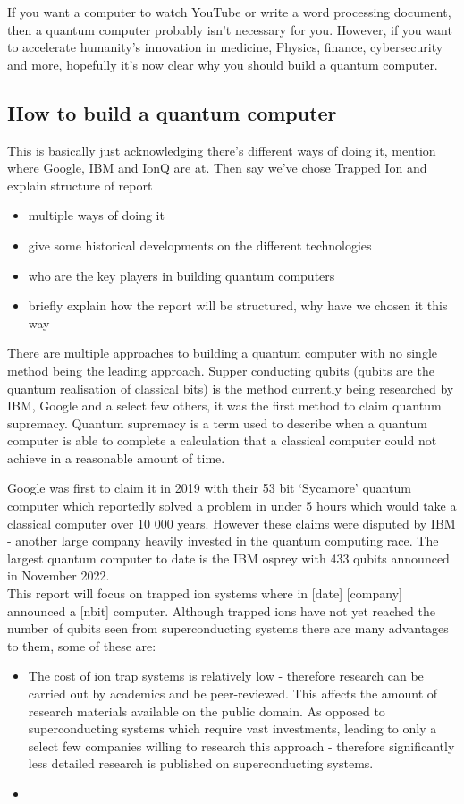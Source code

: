 If you want a computer to watch YouTube or write a word processing document, then a quantum computer probably isn't necessary for you. However, if you want to accelerate humanity's innovation in medicine, Physics, finance, cybersecurity and more, hopefully it's now clear why you should build a quantum computer.

\subsection{How to build a quantum computer}
This is basically just acknowledging there's different ways of doing it, mention where Google, IBM and IonQ are at. Then say we've chose Trapped Ion and explain structure of report 
\begin{itemize}
    \item multiple ways of doing it
    \item give some historical developments on the different technologies
    \item who are the key players in building quantum computers
    \item briefly explain how the report will be structured, why have we chosen it this way
\end{itemize}

There are multiple approaches to building a quantum computer with no single method being the leading approach.
Supper conducting qubits (qubits are the quantum realisation of classical bits) is the method currently being researched by IBM, Google and a select few others, it was the first method to claim quantum supremacy. \cite{gibney_hello_2019}
Quantum supremacy is a term used to describe when a quantum computer is able to complete a calculation that a classical computer could not achieve in a reasonable amount of time. 

Google was first to claim it in 2019 with their 53 bit `Sycamore' quantum computer which reportedly solved a problem in under 5 hours which would take a classical computer over 10 000 years. \cite{gibney_hello_2019} 
However these claims were disputed by IBM - another large company heavily invested in the quantum computing race.
The largest quantum computer to date is the IBM osprey with 433 qubits announced in November 2022.\\


This report will focus on trapped ion systems where in [date] [company] announced a [nbit] computer. Although trapped ions have not yet reached the number of qubits seen from superconducting systems there are many advantages to them, some of these are: 
\begin{itemize}
    \item The cost of ion trap systems is relatively low - therefore research can be carried out by academics and be peer-reviewed. This affects the amount of research materials available on the public domain. As opposed to superconducting systems which require vast investments, leading to only a select few companies willing to research this approach - therefore significantly less detailed research is published on superconducting systems. 
    \item 
\end{itemize}

